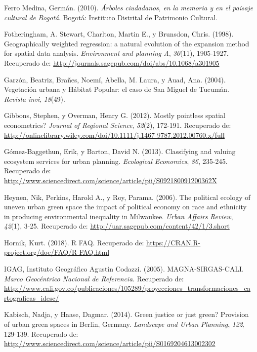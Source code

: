 \documentclass[12pt,a4paper,openany]{book}
\theoremstyle{definition}
\theoremstyle{definition}
\theoremstyle{definition}
\theoremstyle{remark}
\begin{document}
\hypertarget{ref-ferro_medina_arboles_2010}{}
Ferro Medina, Germán. (2010). \emph{Árboles ciudadanos, en la memoria y
en el paisaje cultural de Bogotá}. Bogotá: Instituto Distrital de
Patrimonio Cultural.

\hypertarget{ref-fotheringham_geographically_1998}{}
Fotheringham, A. Stewart, Charlton, Martin E., y Brunsdon, Chris.
(1998). Geographically weighted regression: a natural evolution of the
expansion method for spatial data analysis. \emph{Environment and
planning A}, \emph{30}(11), 1905-1927. Recuperado de:
\url{http://journals.sagepub.com/doi/abs/10.1068/a301905}

\hypertarget{ref-garzon2004vegetacion}{}
Garzón, Beatriz, Brañes, Noemí, Abella, M. Laura, y Auad, Ana. (2004).
Vegetación urbana y Hábitat Popular: el caso de San Miguel de Tucumán.
\emph{Revista invi}, \emph{18}(49).

\hypertarget{ref-gibbons_mostly_2012}{}
Gibbons, Stephen, y Overman, Henry G. (2012). Mostly pointless spatial
econometrics? \emph{Journal of Regional Science}, \emph{52}(2), 172-191.
Recuperado de:
\url{http://onlinelibrary.wiley.com/doi/10.1111/j.1467-9787.2012.00760.x/full}

\hypertarget{ref-gomez-baggethun_classifying_2013}{}
Gómez-Baggethun, Erik, y Barton, David N. (2013). Classifying and
valuing ecosystem services for urban planning. \emph{Ecological
Economics}, \emph{86}, 235-245. Recuperado de:
\url{http://www.sciencedirect.com/science/article/pii/S092180091200362X}

\hypertarget{ref-heynen_political_2006}{}
Heynen, Nik, Perkins, Harold A., y Roy, Parama. (2006). The political
ecology of uneven urban green space the impact of political economy on
race and ethnicity in producing environmental inequality in Milwaukee.
\emph{Urban Affairs Review}, \emph{42}(1), 3-25. Recuperado de:
\url{http://uar.sagepub.com/content/42/1/3.short}

\hypertarget{ref-R-cran}{}
Hornik, Kurt. (2018). R FAQ. Recuperado de:
\url{https://CRAN.R-project.org/doc/FAQ/R-FAQ.html}

\hypertarget{ref-igagMC2005}{}
IGAG, Instituto Geográfico Agustín Codazzi. (2005). MAGNA-SIRGAS-CALI.
\emph{Marco Geocéntrico Nacional de Referencia}. Recuperado de:
\url{http://www.cali.gov.co/publicaciones/105289/proyecciones_transformaciones_cartograficas_idesc/}

\hypertarget{ref-kabisch_green_2014}{}
Kabisch, Nadja, y Haase, Dagmar. (2014). Green justice or just green?
Provision of urban green spaces in Berlin, Germany. \emph{Landscape and
Urban Planning}, \emph{122}, 129-139. Recuperado de:
\url{http://www.sciencedirect.com/science/article/pii/S0169204613002302}
\end{document}
